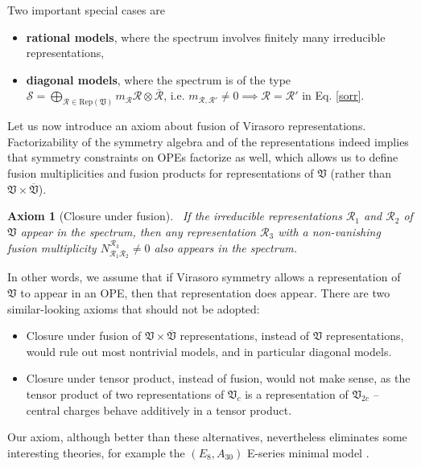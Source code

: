 \documentclass[12pt, a4paper, notitlepage, twoside]{report}
\numberwithin{equation}{section}
\theoremstyle{break}
\newtheorem{hyp}{Axiom}[chapter]
\begin{document}
Two important special cases are
\begin{itemize}
\item \textbf{\boldmath rational models}, where the spectrum involves finitely many irreducible representations,
 \item \textbf{\boldmath diagonal models}, where the spectrum is of the type $\mathcal{S}=\bigoplus_{\mathcal{R}\in \text{Rep}(\mathfrak{V})} m_\mathcal{R} \mathcal{R}\otimes \bar{\mathcal{R}}$, i.e. $m_{\mathcal{R},\mathcal{R}'}\neq 0 \implies \mathcal{R}=\mathcal{R}'$ in Eq. \eqref{sorr}.
\end{itemize}
Let us now introduce an axiom about fusion of Virasoro representations. Factorizability of the symmetry algebra and of the representations indeed implies that symmetry constraints on OPEs factorize as well, which allows us to define fusion multiplicities and fusion products for representations of $\mathfrak{V}$ (rather than $\mathfrak{V}\times \overline{\mathfrak{V}}$). 

\begin{hyp}[Closure under fusion]
~\label{ax:cuf}
If the irreducible representations $\mathcal{R}_1$ and $\mathcal{R}_2$ of $\mathfrak{V}$ appear in the spectrum, then any representation $\mathcal{R}_3$ with a non-vanishing fusion multiplicity $N_{\mathcal{R}_1\mathcal{R}_2}^{\mathcal{R}_3}\neq 0$ also appears in the spectrum. 
\end{hyp} 
\noindent
In other words, we assume that if Virasoro symmetry allows a representation of $\mathfrak{V}$ to appear in an OPE, then that representation does appear.
There are two similar-looking axioms that should not be adopted:
\begin{itemize}
 \item Closure under fusion of $\mathfrak{V}\times \overline{\mathfrak{V}}$ representations, instead of $\mathfrak{V}$ representations, would rule out most nontrivial models, and in particular diagonal models. 
\item Closure under tensor product, instead of fusion, would not make sense, as the tensor product of two representations of $\mathfrak{V}_c$ is a representation of $\mathfrak{V}_{2c}$ -- central charges behave additively in a tensor product. 
\end{itemize}
Our axiom, although better than these alternatives, nevertheless eliminates some interesting theories, for example the $(E_8,A_{30})$ E-series minimal model \cite{fms97}.
\end{document}
